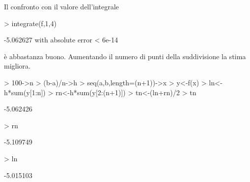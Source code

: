\documentclass[onecolumn,11pt]{book}
\begin{document}
Il confronto con il valore dell'integrale
\begin{Schunk}
\begin{Sinput}
> integrate(f,1,4)
\end{Sinput}
\begin{Soutput}
-5.062627 with absolute error < 6e-14
\end{Soutput}
\end{Schunk}
\`e abbastanza buono. Aumentando il numero di punti della suddivisione la stima migliora.
\begin{Schunk}
\begin{Sinput}
> 100->n
> (b-a)/n->h
> seq(a,b,length=(n+1))->x
> y<-f(x)
> ln<-h*sum(y[1:n])
> rn<-h*sum(y[2:(n+1)])
> tn<-(ln+rn)/2
> tn
\end{Sinput}
\begin{Soutput}
[1] -5.062426
\end{Soutput}
\begin{Sinput}
> rn
\end{Sinput}
\begin{Soutput}
[1] -5.109749
\end{Soutput}
\begin{Sinput}
> ln
\end{Sinput}
\begin{Soutput}
[1] -5.015103
\end{Soutput}
\end{Schunk}
  
\end{document}
